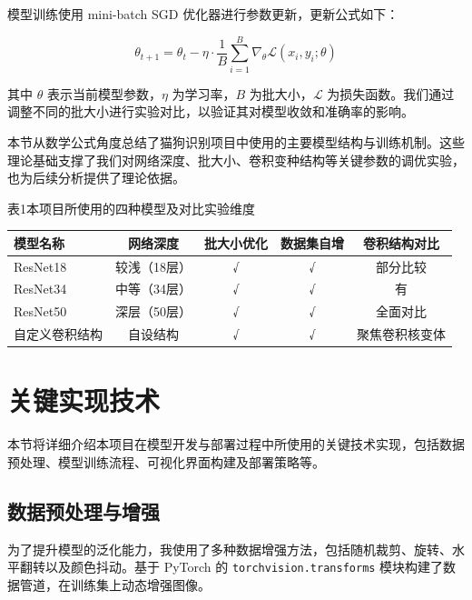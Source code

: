 \documentclass[10.5pt,compsoc]{CjC}
\theoremstyle{mystyle}
\begin{document}
\begin{CJK*}{GBK}{song}
模型训练使用 mini-batch SGD 优化器进行参数更新，更新公式如下：

\begin{equation}
\theta_{t+1} = \theta_t - \eta \cdot \frac{1}{B} \sum_{i=1}^{B} \nabla_\theta \mathcal{L}(x_i, y_i; \theta)
\end{equation}

其中 $\theta$ 表示当前模型参数，$\eta$ 为学习率，$B$ 为批大小，$\mathcal{L}$ 为损失函数。我们通过调整不同的批大小进行实验对比，以验证其对模型收敛和准确率的影响。


本节从数学公式角度总结了猫狗识别项目中使用的主要模型结构与训练机制。这些理论基础支撑了我们对网络深度、批大小、卷积变种结构等关键参数的调优实验，也为后续分析提供了理论依据。

\begin{table}[htbp]
\centering
{\begin{CJK*}{GBK}{hei}表1\quad 本项目所使用的四种模型及对比实验维度\end{CJK*}}
\vspace{-2.5mm}
\begin{scriptsize} %
\begin{tabular}{lcccc}
\toprule
模型名称 & 网络深度 & 批大小优化 & 数据集自增 & 卷积结构对比 \\
\midrule
ResNet18 & 较浅（18层） & √ & √ & 部分比较 \\
ResNet34 & 中等（34层） & √ & √ & 有 \\
ResNet50 & 深层（50层） & √ & √ & 全面对比 \\
自定义卷积结构 & 自设结构 & √ & √ & 聚焦卷积核变体 \\
\bottomrule
\end{tabular}
\end{scriptsize}
\label{tab1}
\end{table}

\section{关键实现技术}
{\begin{CJK*}{GBK}{hei}本节将详细介绍本项目在模型开发与部署过程中所使用的关键技术实现，包括数据预处理、模型训练流程、可视化界面构建及部署策略等。\end{CJK*}}

\subsection{数据预处理与增强}
为了提升模型的泛化能力，我使用了多种数据增强方法，包括随机裁剪、旋转、水平翻转以及颜色抖动。基于 PyTorch 的 \texttt{torchvision.transforms} 模块构建了数据管道，在训练集上动态增强图像。


\end{CJK*}
\end{document}
